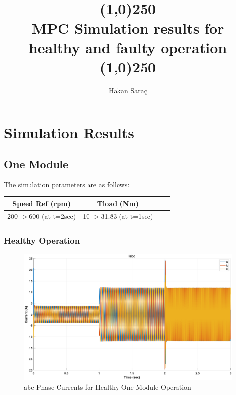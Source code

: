 \documentclass{article}
\author{\hisfont Hakan Saraç}
\date{}
\begin{document}
\title{\line(1,0){250}\\\myfont MPC Simulation results for healthy and faulty operation\\\line(1,0){250}}
\maketitle
\newpage
\tableofcontents
\newpage

\section{Simulation Results}
\subsection{One Module}
The simulation parameters are as follows:
\begin{center}
 \begin{tabular}{||c | c | c | c||} 
 \hline
Speed Ref (rpm) & Tload (Nm)  \\ [0.5ex] 
 \hline\hline
200-$>$600 (at t=2sec) & 10-$>$31.83 (at t=1sec)  \\ 
 \hline
\end{tabular}
\end{center}

\subsubsection{Healthy Operation}



\begin{figure}[H]
\centering
\includegraphics[scale=0.35]{SimulationResults/one_module/Iabc.eps}
\caption{abc Phase Currents for Healthy One Module Operation}
\label{fig:PhaseCurrentsAbcOneModuleHealthy}
\end{figure}
\end{document}
